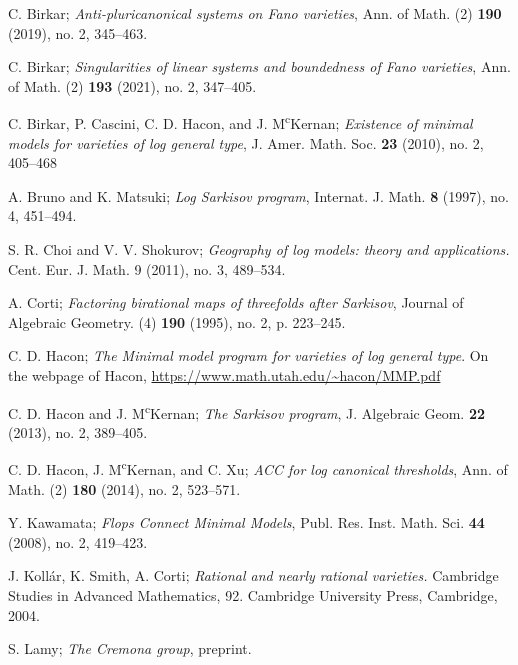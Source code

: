 \begin{thebibliography}{99}
   C. Birkar;
  \textit{Anti-pluricanonical systems on Fano varieties}, Ann. of Math. (2) \textbf{190} (2019), no. 2,  345--463.

  C. Birkar;
  \textit{Singularities of linear systems and boundedness of Fano varieties},
  Ann. of Math. (2) \textbf{193} (2021), no. 2, 347–405.

  C. Birkar, P. Cascini, C. D. Hacon, and J. M\textsuperscript{c}Kernan;  \textit{Existence of minimal models for varieties of log general type}, J. Amer. Math. Soc. \textbf{23} (2010), no. 2, 405--468

  A. Bruno and K. Matsuki; \textit{Log {S}arkisov program},
  Internat. J. Math. \textbf{8} (1997), no. 4, 451–494.

  S. R. Choi and V. V. Shokurov; \textit{Geography of log models: theory and applications.}
  Cent. Eur. J. Math. 9 (2011), no. 3, 489--534.

   A. Corti;
  \textit{Factoring birational maps of threefolds after {{Sarkisov}}},
  Journal of Algebraic Geometry. (4) \textbf{190} (1995), no. 2, p. 223--245.

  C. D. Hacon;
  \textit{The {{Minimal}} model program for {{varieties}} of log general type}. On the webpage of Hacon,
  \url{https://www.math.utah.edu/~hacon/MMP.pdf}

  C. D. Hacon and J. M\textsuperscript{c}Kernan;
  \textit{The {{Sarkisov}} program},
  J. Algebraic Geom. \textbf{22} (2013), no. 2, 389–405.

   C. D. Hacon, J. M\textsuperscript{c}Kernan, and C. Xu; \textit{ACC for log canonical thresholds}, Ann. of Math. (2) \textbf{180} (2014), no. 2, 523--571.

  Y. Kawamata;
  \textit{Flops {{Connect Minimal Models}}},
  Publ. Res. Inst. Math. Sci. \textbf{44} (2008), no. 2, 419–423.

  J. Koll\'{a}r, K. Smith, A. Corti; \textit{Rational and nearly rational varieties.} Cambridge Studies in Advanced Mathematics, 92. Cambridge University Press, Cambridge, 2004.

   S. Lamy; \textit{The Cremona group}, preprint.


\end{thebibliography}
